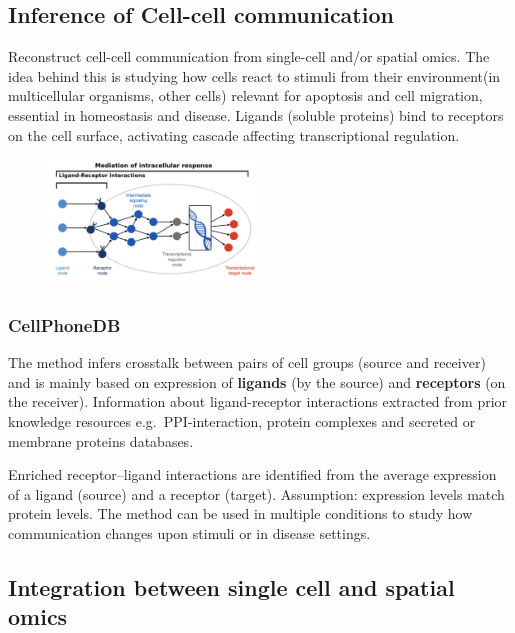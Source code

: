 \hypertarget{inference-of-cell-cell-communication}{%
\subsection{Inference of Cell-cell
communication}\label{inference-of-cell-cell-communication}}

Reconstruct cell-cell communication from single-cell and/or spatial
omics. The idea behind this is studying how cells react to stimuli from
their environment(in multicellular organisms, other cells) relevant for
apoptosis and cell migration, essential in homeostasis and disease.
Ligands (soluble proteins) bind to receptors on the cell surface,
activating cascade affecting transcriptional regulation.

\begin{figure}
\centering
\includegraphics[width=0.5\textwidth]{images/Screenshot_10.png}
\caption{}
\end{figure}

\hypertarget{cellphonedb}{%
\subsubsection{CellPhoneDB}\label{cellphonedb}}

The method infers crosstalk between pairs of cell groups (source and
receiver) and is mainly based on expression of \textbf{ligands} (by the
source) and \textbf{receptors} (on the receiver). Information about
ligand-receptor interactions extracted from prior knowledge resources
e.g.~PPI-interaction, protein complexes and secreted or membrane
proteins databases.

Enriched receptor--ligand interactions are identified from the average
expression of a ligand (source) and a receptor (target). Assumption:
expression levels match protein levels. The method can be used in
multiple conditions to study how communication changes upon stimuli or
in disease settings.

\hypertarget{integration-between-single-cell-and-spatial-omics}{%
\subsection{Integration between single cell and spatial
omics}\label{integration-between-single-cell-and-spatial-omics}}

